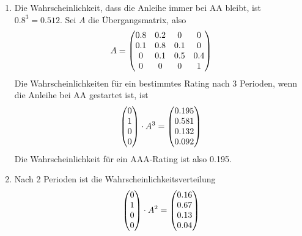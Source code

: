 \documentclass{article}
\begin{document}
\begin{enumerate}[label=(\alph*)]
\begin{center}
		\end{center}
		\item Die Wahrscheinlichkeit, dass die Anleihe immer bei AA bleibt, ist $0.8^3=0.512$. Sei $A$ die Übergangsmatrix, also
		\begin{align}
			A = \begin{pmatrix}
				0.8 & 0.2 & 0 & 0 \\
				0.1 & 0.8 & 0.1 & 0 \\
				0 & 0.1 & 0.5 & 0.4 \\
				0 & 0 & 0 & 1
			\end{pmatrix} \notag
		\end{align}
		Die Wahrscheinlichkeiten für ein bestimmtes Rating nach 3 Perioden, wenn die Anleihe bei AA gestartet ist, ist
		\begin{align}
			\begin{pmatrix}
				0 \\ 1 \\ 0 \\ 0
			\end{pmatrix} \cdot A^3 = \begin{pmatrix}
				0.195 \\ 0.581 \\ 0.132 \\ 0.092
			\end{pmatrix} \notag
		\end{align}
		Die Wahrscheinlichkeit für ein AAA-Rating ist also 0.195.
		\item Nach 2 Perioden ist die Wahrscheinlichkeitsverteilung
		\begin{align}
			\begin{pmatrix}
				0 \\ 1 \\ 0 \\ 0
			\end{pmatrix} \cdot A^2 = \begin{pmatrix}
				0.16 \\ 0.67 \\ 0.13 \\ 0.04
			\end{pmatrix} \notag

\end{align}
\end{enumerate}
\end{document}

